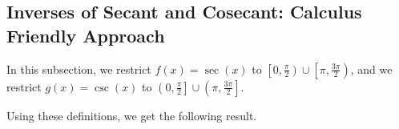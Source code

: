 \medskip



\subsection{Inverses of Secant and Cosecant: Calculus Friendly Approach}

In this subsection, we restrict $f(x) = \sec(x)$ to $\left[0, \frac{\pi}{2}\right) \cup \left[\pi, \frac{3\pi}{2}\right)$,  and we restrict $g(x) = \csc(x)$ to $\left(0, \frac{\pi}{2}\right] \cup \left( \pi, \frac{3\pi}{2}\right]$.  


Using these definitions, we get the following result.

\smallskip

